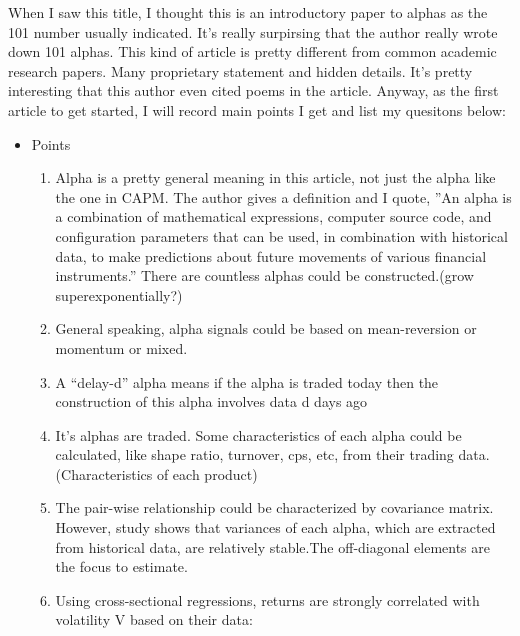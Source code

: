 \documentclass[fontsize=11pt, %
                             paper=a4, %
                             twoside, %
                             captions=tableheading,
                             index=totoc,
                             hyperref]{labbook}
\begin{document}
\begin{addmargin}[4cm]{0cm} %

\pagestyle{scrheadings} %

When I saw this title, I thought this is an introductory paper to alphas as the 101 number usually indicated. It's really surpirsing that the author really wrote down 101 alphas. This kind of article is pretty different from common academic research papers. Many proprietary statement and hidden details. It's pretty interesting that this author even cited poems in the article. Anyway, as the first article to get started, I will record main points I get and list my quesitons below:
\begin{itemize}
\item Points
\begin{enumerate}
\item
Alpha is a pretty general meaning in this article, not just the alpha like the one in CAPM. The author gives a definition and I quote, ''An alpha is a combination of mathematical expressions, computer source code, and configuration parameters that can be used, in combination with historical data, to make predictions about future movements of various financial instruments.'' There are countless alphas could be constructed.(grow superexponentially?)
\item
General speaking, alpha signals could be based on mean-reversion or momentum or mixed.
\item
A ``delay-d'' alpha means if the alpha is traded today then the construction of this alpha involves data d days ago
\item
It's alphas are traded. Some characteristics of each alpha could be calculated, like shape ratio, turnover, cps, etc, from their trading data. (Characteristics of each product)
\item
The pair-wise relationship could be characterized by covariance matrix. However, study shows that variances of each alpha, which are extracted from historical data, are relatively stable.The off-diagonal elements are the focus to estimate.
\item
Using cross-sectional regressions, returns are strongly correlated with volatility V based on their data:

\end{enumerate}
\end{itemize}
\end{addmargin}
\end{document}
